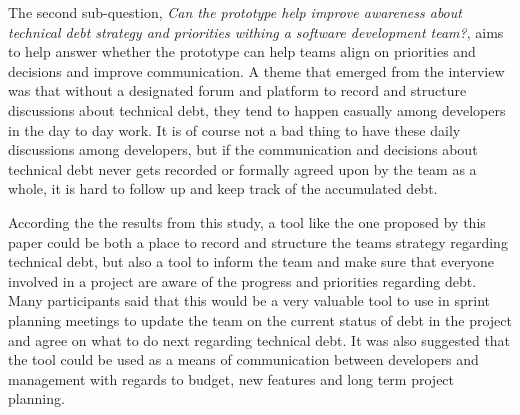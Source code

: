The second sub-question, \textit{Can the prototype help improve awareness about technical debt strategy and priorities withing a software development team?}, aims to help answer whether the prototype can help teams align on priorities and decisions and improve communication.
A theme that emerged from the interview was that without a designated forum and platform to record and structure discussions about technical debt, they tend to happen casually among developers in the day to day work.
It is of course not a bad thing to have these daily discussions among developers, but if the communication and decisions about technical debt never gets recorded or formally agreed upon by the team as a whole, it is hard to follow up and keep track of the accumulated debt.

According the the results from this study, a tool like the one proposed by this paper could be both a place to record and structure the teams strategy regarding technical debt, but also a tool to inform the team and make sure that everyone involved in a project are aware of the progress and priorities regarding debt.
Many participants said that this would be a very valuable tool to use in sprint planning meetings to update the team on the current status of debt in the project and agree on what to do next regarding technical debt.
It was also suggested that the tool could be used as a means of communication between developers and management with regards to budget, new features and long term project planning.

